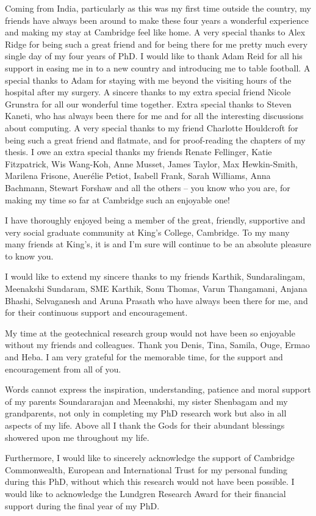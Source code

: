 \begin{acknowledgements}
Coming from India, particularly as this was my first time outside the country, 
my friends have always been around to make these four years a wonderful 
experience and making my stay at Cambridge feel like home. A very special 
thanks to Alex Ridge for being such a great friend 
and for being there for me pretty much every single day of my four years of 
PhD. I would like to thank Adam Reid for all his support in easing me in to a 
new country and introducing me to table football. A special thanks to Adam for 
staying with me beyond the visiting hours of the hospital after my surgery. A 
sincere thanks to my extra special friend Nicole Grunstra for all our 
wonderful time together. Extra special thanks to Steven Kaneti, who has always 
been there for me and for all the interesting discussions about computing. A 
very special thanks to my friend Charlotte Houldcroft for being such a great 
friend and flatmate, and for proof-reading the chapters of my thesis. I owe 
an extra special 
thanks my friends Renate Fellinger, Katie Fitzpatrick, Wis Wang-Koh, Anne 
Musset, James Taylor, Max Hewkin-Smith, Marilena Frisone, Auer\'{e}lie Petiot, 
Isabell Frank, Sarah Williams, Anna Bachmann, Stewart Forshaw and all the 
others -- you know who you are, for making my time so far at Cambridge such an 
enjoyable one!

I have thoroughly enjoyed being a member of the great, friendly, supportive and 
very social graduate community at King's College, Cambridge. To my many many 
friends at King's, it is and I'm sure will continue to be an absolute pleasure 
to know you. %

I would like to extend my sincere thanks to my friends Karthik, Sundaralingam, 
Meenakshi Sundaram, SME Karthik, Sonu Thomas, Varun Thangamani, Anjana Bhashi,  
Selvaganesh and Aruna Prasath who have always been there for me, and for their 
continuous support and encouragement. 

My time at the geotechnical research group would not have been so enjoyable 
without my friends and colleagues. Thank you Denis, Tina, Samila, Ouge, Ermao 
and Heba. I am very grateful for the memorable time, for the support and 
encouragement from all of you.

Words cannot express the inspiration, understanding, patience and moral support 
of my parents Soundararajan and Meenakshi, my sister Shenbagam and my 
grandparents, not only in completing my PhD research work but also in all 
aspects of my life. Above all I thank the Gods for their abundant blessings 
showered upon me throughout my life.

Furthermore, I would like to sincerely acknowledge the support of Cambridge 
Commonwealth, European and International Trust for my personal funding during 
this PhD, without which this research would not have been possible. I would 
like to acknowledge the Lundgren Research Award for their financial support 
during the final year of my PhD.

\end{acknowledgements}
